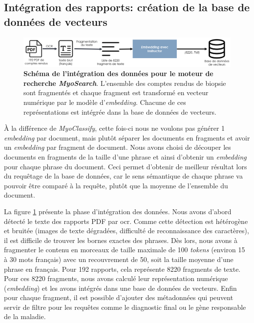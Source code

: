 \subsection{Intégration des rapports: création de la base de données de vecteurs}
\begin{figure}[!htbp]
 \centering
 \includegraphics[width=1\textwidth]{figures/myosearch_ingest.png}
 \caption[Intégration des données dans \textit{MyoSearch}]{\textbf{Schéma de l'intégration des données pour le moteur de recherche \textit{MyoSearch}}. L'ensemble des comptes rendus de biopsie sont fragmentés et chaque fragment est transformé en vecteur numérique par le modèle d'\textit{embedding}. Chacune de ces représentations est intégrée dans la base de données de vecteurs.}
 \label{fig:myosearch_ingest}
\end{figure}

À la différence de \textit{MyoClassify}, cette fois-ci nous ne voulons pas générer 1 \textit{embedding} par document, mais plutôt séparer les documents en fragments et avoir un \textit{embedding} par fragment de document. Nous avons choisi de découper les documents en fragments de la taille d'une phrase et ainsi d'obtenir un \textit{embedding} pour chaque phrase du document. Ceci permet d'obtenir de meilleur résultat lors du requêtage de la base de données, car le sens sémantique de chaque phrase va pouvoir être comparé à la requête, plutôt que la moyenne de l'ensemble du document.

La figure \ref{fig:myosearch_ingest} présente la phase d'intégration des données. Nous avons d'abord détecté le texte des rapports PDF par \gls{ocr}. Comme cette détection est hétérogène et bruitée (images de texte dégradées, difficulté de reconnaissance des caractères), il est difficile de trouver les bornes exactes des phrases. Dès lors, nous avons à fragmenter le contenu en morceaux de taille maximale de 100 \textit{tokens} (environ 15 à 30 mots français) avec un recouvrement de 50, soit la taille moyenne d'une phrase en français. Pour 192 rapports, cela représente 8220 fragments de texte. Pour ces 8220 fragments, nous avons calculé leur représentation numérique (\textit{embedding}) et les avons intégrés dans une base de données de vecteurs. Enfin pour chaque fragment, il est possible d'ajouter des métadonnées qui peuvent servir de filtre pour les requêtes comme le diagnostic final ou le gène responsable de la maladie.

